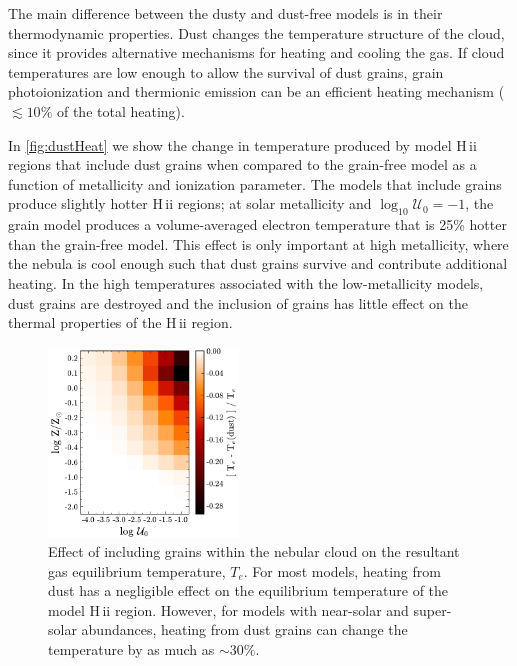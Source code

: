 \documentclass[linenumbers, tighten, trackchanges]{aastex61}%
\newcommand{\Fig}[1]{\autoref{fig:#1}}
\newcommand{\logten}{\ensuremath{\log_{10}}}
\newcommand{\Te}{\ensuremath{T_{e}}}
\newcommand{\hii}{H\,{\sc ii}\xspace}
\newcommand{\logU}{\ensuremath{\logten \mathcal{U}_0}}
\begin{document}
The main difference between the dusty and dust-free models is in their thermodynamic properties. Dust changes the temperature structure of the cloud, since it provides alternative mechanisms for heating and cooling the gas. If cloud temperatures are low enough to allow the survival of dust grains, grain photoionization and thermionic emission can be an efficient heating mechanism ($\lesssim10\%$ of the total heating). 

In \Fig{dustHeat} we show the change in temperature produced by model \hii regions that include dust grains when compared to the grain-free model as a function of metallicity and ionization parameter. The models that include grains produce slightly hotter \hii regions; at solar metallicity and $\logU = -1$, the grain model produces a volume-averaged electron temperature that is 25\% hotter than the grain-free model. This effect is only important at high metallicity, where the nebula is cool enough such that dust grains survive and contribute additional heating. In the high temperatures associated with the low-metallicity models, dust grains are destroyed and the inclusion of grains has little effect on the thermal properties of the \hii region. 

\begin{figure}[!htbp]
  \begin{centering}
    \includegraphics[width=0.45\textwidth]{f30.pdf}
    \caption{Effect of including grains within the nebular cloud on the resultant gas equilibrium temperature, \Te{}. For most models, heating from dust has a negligible effect on the equilibrium temperature of the model \hii region. However, for models with near-solar and super-solar abundances, heating from dust grains can change the temperature by as much as ${\sim}30\%$.}
    \label{fig:dustHeat}
  \end{centering}
\end{figure}
\end{document}

